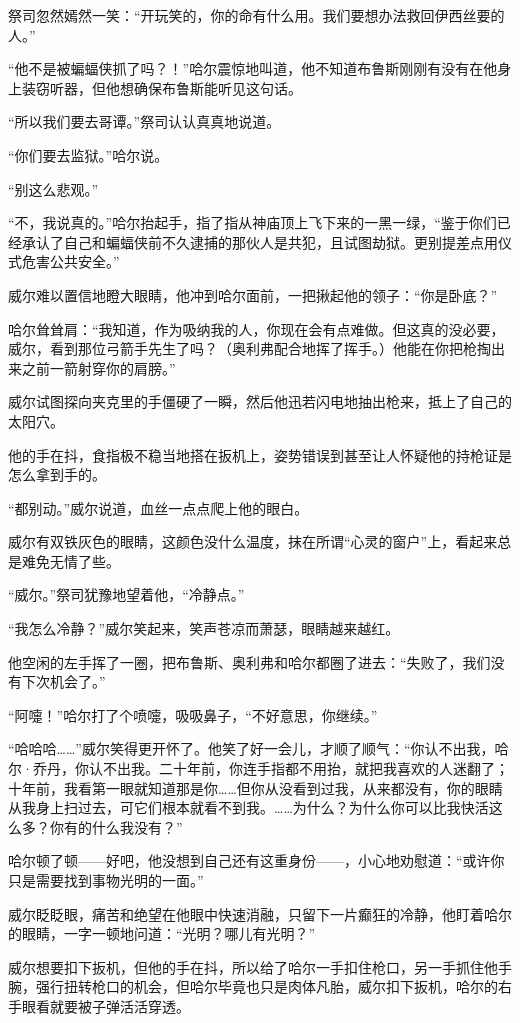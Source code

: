 \documentclass[../main]{subfiles}
\begin{document}
祭司忽然嫣然一笑：“开玩笑的，你的命有什么用。我们要想办法救回伊西丝要的人。”

“他不是被蝙蝠侠抓了吗？！”哈尔震惊地叫道，他不知道布鲁斯刚刚有没有在他身上装窃听器，但他想确保布鲁斯能听见这句话。

“所以我们要去哥谭。”祭司认认真真地说道。

“你们要去监狱。”哈尔说。

“别这么悲观。”

“不，我说真的。”哈尔抬起手，指了指从神庙顶上飞下来的一黑一绿，“鉴于你们已经承认了自己和蝙蝠侠前不久逮捕的那伙人是共犯，且试图劫狱。更别提差点用仪式危害公共安全。”

威尔难以置信地瞪大眼睛，他冲到哈尔面前，一把揪起他的领子：“你是卧底？”

哈尔耸耸肩：“我知道，作为吸纳我的人，你现在会有点难做。但这真的没必要，威尔，看到那位弓箭手先生了吗？（奥利弗配合地挥了挥手。）他能在你把枪掏出来之前一箭射穿你的肩膀。”

威尔试图探向夹克里的手僵硬了一瞬，然后他迅若闪电地抽出枪来，抵上了自己的太阳穴。

他的手在抖，食指极不稳当地搭在扳机上，姿势错误到甚至让人怀疑他的持枪证是怎么拿到手的。

“都别动。”威尔说道，血丝一点点爬上他的眼白。

威尔有双铁灰色的眼睛，这颜色没什么温度，抹在所谓“心灵的窗户”上，看起来总是难免无情了些。

“威尔。”祭司犹豫地望着他，“冷静点。”

“我怎么冷静？”威尔笑起来，笑声苍凉而萧瑟，眼睛越来越红。

他空闲的左手挥了一圈，把布鲁斯、奥利弗和哈尔都圈了进去：“失败了，我们没有下次机会了。”

“阿嚏！”哈尔打了个喷嚏，吸吸鼻子，“不好意思，你继续。”

“哈哈哈\ldots\ldots”威尔笑得更开怀了。他笑了好一会儿，才顺了顺气：“你认不出我，哈尔·乔丹，你认不出我。二十年前，你连手指都不用抬，就把我喜欢的人迷翻了；十年前，我看第一眼就知道那是你……但你从没看到过我，从来都没有，你的眼睛从我身上扫过去，可它们根本就看不到我。……为什么？为什么你可以比我快活这么多？你有的什么我没有？”

哈尔顿了顿——好吧，他没想到自己还有这重身份——，小心地劝慰道：“或许你只是需要找到事物光明的一面。”

威尔眨眨眼，痛苦和绝望在他眼中快速消融，只留下一片癫狂的冷静，他盯着哈尔的眼睛，一字一顿地问道：“光明？哪儿有光明？”

威尔想要扣下扳机，但他的手在抖，所以给了哈尔一手扣住枪口，另一手抓住他手腕，强行扭转枪口的机会，但哈尔毕竟也只是肉体凡胎，威尔扣下扳机，哈尔的右手眼看就要被子弹活活穿透。
\end{document}
